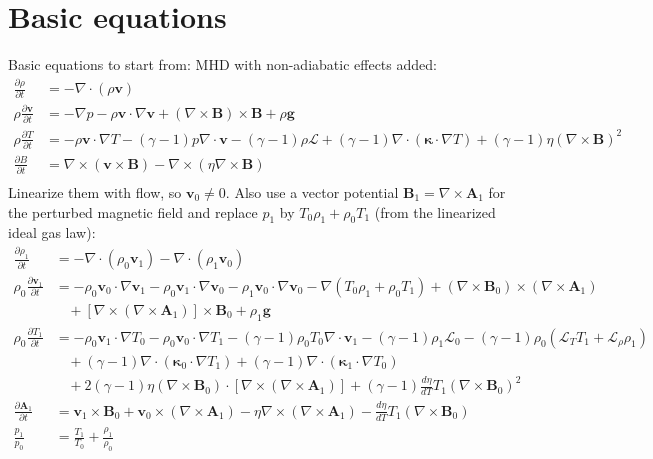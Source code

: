 \documentclass[11pt, fleqn]{article}
\newcommand{\HL}{\mathscr{L}}
\newcommand{\bv}{\boldsymbol{v}}
\newcommand{\bb}{\boldsymbol{B}}
\newcommand{\bg}{\boldsymbol{g}}
\newcommand{\bA}{\boldsymbol{A}}
\newcommand{\bkappa}{\boldsymbol{\kappa}}
\begin{document}
\section{Basic equations}
Basic equations to start from: MHD with non-adiabatic effects added:
\begin{equation}
	\begin{aligned}
		\frac{\partial \rho}{\partial t}      &= -\nabla \cdot (\rho \bv)																													\\
		\rho\frac{\partial \bv}{\partial t}   &= -\nabla p - \rho\bv \cdot \nabla\bv + (\nabla \times \bb) \times \bb + \rho\bg																\\
		\rho\frac{\partial T}{\partial t}	  &= -\rho\bv \cdot \nabla T - (\gamma - 1)p\nabla \cdot \bv - (\gamma - 1)\rho\HL + (\gamma - 1)\nabla \cdot (\bkappa \cdot \nabla T)		
											     + (\gamma - 1)\eta (\nabla \times \bb)^2																									\\ 
		\frac{\partial B}{\partial t}		  &= \nabla \times (\bv \times \bb) - \nabla \times (\eta \nabla \times \bb)																	\\
	\end{aligned}
\end{equation}
Linearize them with flow, so $\bv_0 \neq 0$. Also use a vector potential $\bb_1 = \nabla \times \bA_1$ for the perturbed magnetic field and replace $p_1$ by $T_0\rho_1 + \rho_0 T_1$ (from the linearized ideal gas law):
\begin{equation}
	\begin{aligned}
		\frac{\partial \rho_1}{\partial t}		&= -\nabla \cdot (\rho_0\bv_1) - \nabla \cdot (\rho_1\bv_0)	\\
		\rho_0\frac{\partial \bv_1}{\partial t}	&= - \rho_0\bv_0 \cdot \nabla \bv_1 - \rho_0\bv_1 \cdot \nabla \bv_0 - \rho_1\bv_0 \cdot \nabla \bv_0 - \nabla(T_0\rho_1 + \rho_0 T_1) + (\nabla \times \bb_0) \times (\nabla \times \bA_1)		\\
												&~~~~ + \left[\nabla \times (\nabla \times \bA_1) \right] \times \bb_0 + \rho_1 \bg																												\\
		\rho_0\frac{\partial T_1}{\partial t}	&= -\rho_0\bv_1 \cdot \nabla T_0 - \rho_0\bv_0 \cdot \nabla T_1 - (\gamma - 1)\rho_0 T_0 \nabla \cdot \bv_1 - (\gamma - 1)\rho_1 \HL_0 - (\gamma - 1)\rho_0(\HL_T T_1 + \HL_\rho \rho_1)		\\
												&~~~~ +(\gamma - 1)\nabla \cdot (\bkappa_0 \cdot \nabla T_1) + (\gamma - 1)\nabla \cdot (\bkappa_1 \cdot \nabla T_0)																			\\
												&~~~~ + 2(\gamma - 1)\eta(\nabla \times \bb_0) \cdot \left[\nabla \times (\nabla \times \bA_1)\right] + (\gamma - 1)\frac{d\eta}{dT}T_1(\nabla \times \bb_0)^2									\\
		\frac{\partial \bA_1}{\partial t}		&= \bv_1 \times \bb_0 + \bv_0 \times (\nabla \times \bA_1) - \eta \nabla \times (\nabla \times \bA_1) - \frac{d\eta}{dT}T_1(\nabla \times \bb_0)												\\
		\frac{p_1}{p_0}							&= \frac{T_1}{T_0} + \frac{\rho_1}{\rho_0} 
	\end{aligned}
\end{equation}
\end{document}
